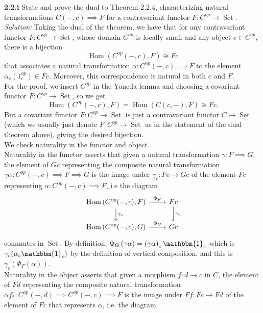 \documentclass[a4paper]{article}
\DeclareMathOperator{\Hom}{Hom}
\DeclareMathOperator{\Set}{Set}
\begin{document}
    \textbf{2.2.i} State and prove the dual to Theorem 2.2.4, characterizing
    natural transformations $C(-, c) \implies F$ for a contravariant functor
    $F  \colon C^{op} \to \Set$.\\
    \linebreak
    \textit{Solution:} Taking the dual of the theorem, we have that
    for any contravariant functor 
    $F  \colon C^{op} \to \Set$, whose domain
    $C^{op}$ is locally small and any object $c \in C^{op}$, there
    is a bijection
    \[
    \Hom \left( C^{op}(-,c), F \right) \cong Fc
    \] 
    that associates a natural transformation
    $\alpha  \colon C^{op}\left( -, c \right) 
    \implies F$ to the element $\alpha_c (1_c^{op}) \in Fc$. Moreover, this
    correspondence is natural in both $c$ and $F$.\\
    \linebreak
    For the proof, we insert $C^{op}$ in the Yoneda lemma and
    choosing a covariant functor
    $F  \colon C^{op} \to \Set$, so we get
    \[
    \Hom \left( C^{op}(-,c),F \right) 
    = \Hom\left( C(c,-),F\right) \cong
     Fc.
    \] 
    But a covariant functor $F  \colon C^{op} \to \Set$ is just a contravariant
    functor $C \to \Set$ (which we usually just denote
    $F  \colon C^{op} \to \Set$ as in the statement of the dual theorem above),
    giving the desired bijection.\\
    We check naturality in the functor and object.\\

    
    Naturality in the functor asserts that given
    a natural transformation
    $\gamma  \colon F \implies G$, the element
    of $Gc$ representing the composite natural transformation
    $\gamma \alpha  \colon C^{op}(-,c) \implies F \implies G$ is the image
    under $\gamma_c  \colon Fc \to Gc$ of the element
    $Fc$ representing
    $\alpha  \colon C^{op}(-,c) \implies F$, i.e the diagram
    \begin{equation*}
    \begin{tikzcd}
        \Hom\left( C^{op}(-,c),F \right) 
        \arrow[r, "\Phi_F"] \arrow[d, "\gamma_*"] & Fc \arrow[d,
        "\gamma_c"] \\
        \Hom\left( C^{op}(-,c), G \right) \arrow[r, "\Phi_G"]
                            & Gc
    \end{tikzcd}
    \end{equation*}
    commutes in $\Set$. By definition,
    $\Phi_G \left( \gamma \alpha \right) 
    = \left( \gamma \alpha \right)_{c}\mathbbm{1}_{c}$ which is
    $\gamma_c (\alpha_c \mathbbm{1}_c)$ by the definition of vertical
    composition, and this is
    $\gamma_c \left( \Phi_F \left( \alpha \right)  \right) $.\\
    \linebreak
    Naturality in the object asserts that given a morphism
    $f  \colon d \to c$ in $C$, the element of
    $Fd$ representing the composite natural transformation
    $\alpha f_*  \colon C^{op} \left( -,d \right) 
    \implies C^{op} \left( -,c \right) \implies F$ is the image
    under $Ff  \colon Fc \to Fd$ of the element of $Fc$ that represents
    $\alpha$, i.e. the diagram
    
\end{document}
